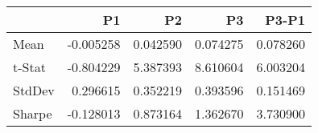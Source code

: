 \begin{tabular}{lrrrr}
\toprule
 & P1 & P2 & P3 & P3-P1 \\
\midrule
Mean & -0.005258 & 0.042590 & 0.074275 & 0.078260 \\
t-Stat & -0.804229 & 5.387393 & 8.610604 & 6.003204 \\
StdDev & 0.296615 & 0.352219 & 0.393596 & 0.151469 \\
Sharpe & -0.128013 & 0.873164 & 1.362670 & 3.730900 \\
\bottomrule
\end{tabular}

